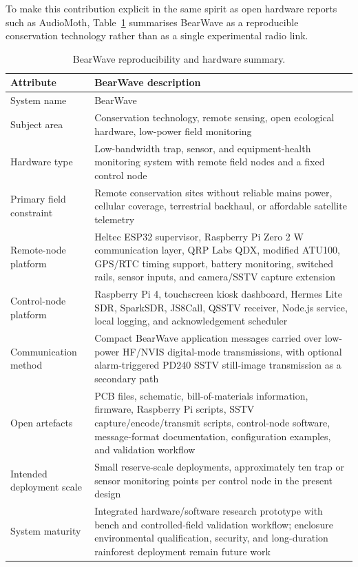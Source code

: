 \documentclass[acmsmall,screen]{acmart}
\begin{document}
To make this contribution explicit in the same spirit as open hardware reports such as AudioMoth, Table~\ref{tab:hardware-summary} summarises BearWave as a reproducible conservation technology rather than as a single experimental radio link.

\begin{table}[H]
\centering
\caption{BearWave reproducibility and hardware summary.}
\label{tab:hardware-summary}
\begin{tabularx}{\textwidth}{p{}X}
\toprule
Attribute & BearWave description \\
\midrule
System name & BearWave \\
Subject area & Conservation technology, remote sensing, open ecological hardware, low-power field monitoring \\
Hardware type & Low-bandwidth trap, sensor, and equipment-health monitoring system with remote field nodes and a fixed control node \\
Primary field constraint & Remote conservation sites without reliable mains power, cellular coverage, terrestrial backhaul, or affordable satellite telemetry \\
Remote-node platform & Heltec ESP32 supervisor, Raspberry Pi Zero 2 W communication layer, QRP Labs QDX, modified ATU100, GPS/RTC timing support, battery monitoring, switched rails, sensor inputs, and camera/SSTV capture extension \\
Control-node platform & Raspberry Pi 4, touchscreen kiosk dashboard, Hermes Lite SDR, SparkSDR, JS8Call, QSSTV receiver, Node.js service, local logging, and acknowledgement scheduler \\
Communication method & Compact BearWave application messages carried over low-power HF/NVIS digital-mode transmissions, with optional alarm-triggered PD240 SSTV still-image transmission as a secondary path \\
Open artefacts & PCB files, schematic, bill-of-materials information, firmware, Raspberry Pi scripts, SSTV capture/encode/transmit scripts, control-node software, message-format documentation, configuration examples, and validation workflow \\
Intended deployment scale & Small reserve-scale deployments, approximately ten trap or sensor monitoring points per control node in the present design \\
System maturity & Integrated hardware/software research prototype with bench and controlled-field validation workflow; enclosure environmental qualification, security, and long-duration rainforest deployment remain future work \\
\bottomrule
\end{tabularx}
\end{table}
\end{document}
